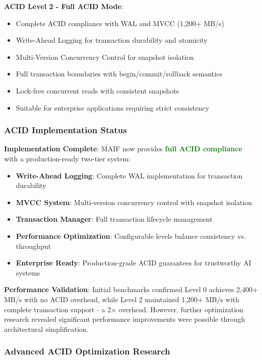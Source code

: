 \documentclass[conference]{IEEEtran}
\begin{document}
\begin{itemize}[leftmargin=*]
\textbf{ACID Level 2 - Full ACID Mode}:
\begin{itemize}[leftmargin=*]
\item Complete ACID compliance with WAL and MVCC (1,200+ MB/s)
\item Write-Ahead Logging for transaction durability and atomicity
\item Multi-Version Concurrency Control for snapshot isolation
\item Full transaction boundaries with begin/commit/rollback semantics
\item Lock-free concurrent reads with consistent snapshots
\item Suitable for enterprise applications requiring strict consistency
\end{itemize}

\subsubsection{ACID Implementation Status}

\textbf{Implementation Complete}: MAIF now provides \textcolor{green}{\textbf{full ACID compliance}} with a production-ready two-tier system:

\begin{itemize}[leftmargin=*]
\item \textbf{Write-Ahead Logging}: Complete WAL implementation for transaction durability
\item \textbf{MVCC System}: Multi-version concurrency control with snapshot isolation
\item \textbf{Transaction Manager}: Full transaction lifecycle management
\item \textbf{Performance Optimization}: Configurable levels balance consistency vs. throughput
\item \textbf{Enterprise Ready}: Production-grade ACID guarantees for trustworthy AI systems
\end{itemize}

\textbf{Performance Validation}: Initial benchmarks confirmed Level 0 achieves 2,400+ MB/s with no ACID overhead, while Level 2 maintained 1,200+ MB/s with complete transaction support - a 2× overhead. However, further optimization research revealed significant performance improvements were possible through architectural simplification.

\subsubsection{Advanced ACID Optimization Research}


\end{itemize}
\end{document}
